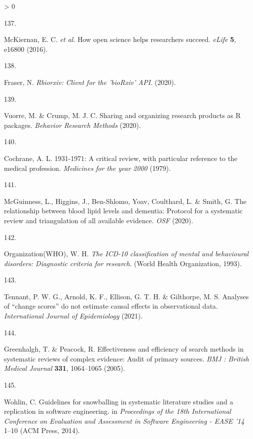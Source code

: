 \documentclass[a4paper, twoside]{templates/ociamthesis}
\newlength{\cslhangindent}
\newlength{\csllabelwidth}
\newenvironment{CSLReferences}[3] %
 {%
  \setlength{\parindent}{0pt}
  \ifodd #1 \everypar{\setlength{\hangindent}{\cslhangindent}}\ignorespaces\fi
  \ifnum #2 > 0
  \setlength{\parskip}{#2\baselineskip}
  \fi
 }%
 {}
\newcommand{\CSLLeftMargin}[1]{\parbox[t]{\maxof{\widthof{#1}}{\csllabelwidth}}{#1}}
\newcommand{\CSLRightInline}[1]{\parbox[t]{\linewidth - \csllabelwidth}{#1}}
\begin{document}
\begin{CSLReferences}{0}{0}
\leavevmode\hypertarget{ref-mckiernan2016}{}%
\CSLLeftMargin{137. }
\CSLRightInline{McKiernan, E. C. \emph{et al.} How open science helps researchers succeed. \emph{eLife} \textbf{5}, e16800 (2016).}

\leavevmode\hypertarget{ref-fraser2020rbiorixv}{}%
\CSLLeftMargin{138. }
\CSLRightInline{Fraser, N. \emph{Rbiorxiv: Client for the '{bioRxiv}' {API}}. (2020).}

\leavevmode\hypertarget{ref-vuorre2020}{}%
\CSLLeftMargin{139. }
\CSLRightInline{Vuorre, M. \& Crump, M. J. C. Sharing and organizing research products as {R} packages. \emph{Behavior Research Methods} (2020).}

\leavevmode\hypertarget{ref-cochrane1979}{}%
\CSLLeftMargin{140. }
\CSLRightInline{Cochrane, A. L. 1931-1971: A critical review, with particular reference to the medical profession. \emph{Medicines for the year 2000} (1979).}

\leavevmode\hypertarget{ref-mcguinnessluke2020}{}%
\CSLLeftMargin{141. }
\CSLRightInline{McGuinness, L., Higgins, J., Ben-Shlomo, Yoav, Coulthard, L. \& Smith, G. The relationship between blood lipid levels and dementia: Protocol for a systematic review and triangulation of all available evidence. \emph{OSF} (2020).}

\leavevmode\hypertarget{ref-organizationwho1993}{}%
\CSLLeftMargin{142. }
\CSLRightInline{Organization(WHO), W. H. \emph{The {ICD}-10 classification of mental and behavioural disorders: Diagnostic criteria for research}. ({World Health Organization}, 1993).}

\leavevmode\hypertarget{ref-tennant2021}{}%
\CSLLeftMargin{143. }
\CSLRightInline{Tennant, P. W. G., Arnold, K. F., Ellison, G. T. H. \& Gilthorpe, M. S. Analyses of {``change scores''} do not estimate causal effects in observational data. \emph{International Journal of Epidemiology} (2021).}

\leavevmode\hypertarget{ref-greenhalgh2005}{}%
\CSLLeftMargin{144. }
\CSLRightInline{Greenhalgh, T. \& Peacock, R. Effectiveness and efficiency of search methods in systematic reviews of complex evidence: Audit of primary sources. \emph{BMJ : British Medical Journal} \textbf{331}, 1064--1065 (2005).}

\leavevmode\hypertarget{ref-wohlin2014}{}%
\CSLLeftMargin{145. }
\CSLRightInline{Wohlin, C. Guidelines for snowballing in systematic literature studies and a replication in software engineering. in \emph{Proceedings of the 18th {International Conference} on {Evaluation} and {Assessment} in {Software Engineering} - {EASE} '14} 1--10 ({ACM Press}, 2014).}


\end{CSLReferences}
\end{document}
